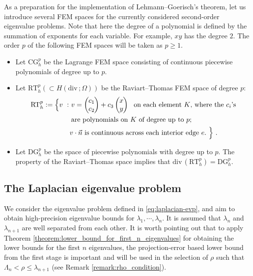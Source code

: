 \documentclass[a4,11pt]{article}
\numberwithin{equation}{section}
\newcommand{\Div}{\mbox{div}\mspace{3mu}}
\begin{document}
As a preparation for the implementation of Lehmann--Goerisch's theorem, let us introduce several FEM spaces for the currently considered second-order eigenvalue problems. Note that here the degree of a polynomial is defined by the summation of exponents for each variable. For example, $xy$ has the degree $2$. The order $p$ of the following FEM spaces will be taken as $p\ge 1$.
\begin{itemize}
\item Let $\text{CG}^p_h$ be the Lagrange FEM space consisting of continuous piecewise polynomials of degree up to $p$.
	\item Let $\text{RT}^p_h(\subset H(\Div ; \Omega))$ be the Raviart--Thomas FEM space of degree $p$:
\begin{align*}
\text{RT}^p_h := \Big\{v~:~
& v= \left(\begin{array}{c}\mspace{-10mu}c_1 \mspace{-10mu}\\ \mspace{-10mu}c_2 \mspace{-10mu}\end{array}\right)
+ c_3 \left(\begin{array}{c}\mspace{-10mu}x \mspace{-10mu}\\ \mspace{-10mu}y \mspace{-10mu}\end{array}\right) 
     \,\,\text{ on each element $K$, where the $c_i$'s} \\
    & \text{are polynomials on $K$ of degree up to $p$;} \\
& \mspace{-10mu}\,\, v\cdot\vec{n} \,\,\text{is continuous across each interior edge } e. ~\Big\}~.
\end{align*}
\item Let $\text{DG}_h^p$ be the space of piecewise polynomials with degree up to $p$. 
The property of the Raviart--Thomas space implies that
$\Div(\text{RT}_h^p) = \text{DG}_h^p$. 
\end{itemize}
\subsection{The Laplacian eigenvalue problem}

We consider the eigenvalue problem defined in \eqref{eq:laplacian-evp}, and aim to obtain high-precision eigenvalue bounds for $\lambda_1, \cdots, \lambda_n$. It is assumed that $\lambda_n$ and $\lambda_{n+1}$ are well separated from each other.
It is worth pointing out that to apply Theorem \ref{theorem:lower_bound_for_first_n_eigenvalues} for obtaining the lower bounds for the first $n$ eigenvalues, the projection-error based lower bound from the first 
stage is important and will be used in the selection of $\rho$ such that $\Lambda_n < \rho \le \lambda_{n+1}$ (see Remark \ref{remark:rho_condition}).
\end{document}
